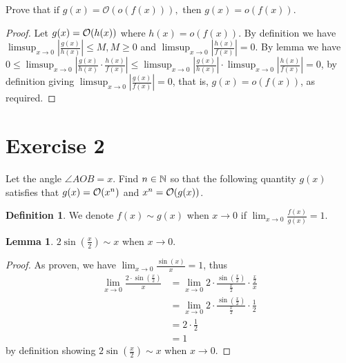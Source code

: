 \documentclass{homework}
\newcommand{\N}{\bb{N}} %
\newcommand{\ra}{\rightarrow}
\newcommand{\?}{\stackrel{?}{=}}
\theoremstyle{definition}
\newtheorem*{definition}{Definition}
\newtheorem*{lemma}{Lemma}
\begin{document}
\question[2] Prove that $\text{if~}g(x)=\mathcal{O}(o(f(x))),\text{~then~}g(x)=o(f(x))$.

\begin{proof}
    Let $g(x)=\cal{O}(h(x))$ where $h(x)=o(f(x))$. By definition we have $\limsup_{x\ra0}|\frac{g(x)}{h(x)}|\leq M, M\geq0$ and $\limsup_{x\ra0}|\frac{h(x)}{f(x)}|=0$. By lemma we have $0\leq\limsup_{x\ra0}|\frac{g(x)}{h(x)}\cdot\frac{h(x)}{f(x)}|\leq\limsup_{x\ra0}|\frac{g(x)}{h(x)}|\cdot\limsup_{x\ra0}|\frac{h(x)}{f(x)}|=0$, by definition giving $\limsup_{x\ra0}|\frac{g(x)}{f(x)}|=0$, that is, $g(x)=o(f(x))$, as required.
\end{proof}

\newpage
\section*{Exercise 2}
Let the angle $\angle AOB=x$. Find $n\in\N$ so that the following quantity $g(x)$ satisfies that $g(x)=\cal{O}(x^n)$ and $x^n=\cal{O}(g(x))$.


\begin{definition}
    We denote $f(x)\sim g(x)$ when $x\to0$ if $\lim_{x\to0}\frac{f(x)}{g(x)}=1$.
\end{definition}

\begin{lemma}
    $2\sin(\frac{x}2)\sim x$ when $x\to0$.

    \begin{proof}
        As proven, we have $\lim_{x\to0}\frac{\sin(x)}{x}=1$, thus \begin{align*}
            \lim_{x\to0}\frac{2\cdot\sin(\frac{x}2)}{x}&=\lim_{x\to0}2\cdot\frac{\sin(\frac{x}2)}{\frac{x}2}\cdot\frac{\frac{x}2}{x}\\
            &=\lim_{x\to0}2\cdot\frac{\sin(\frac{x}2)}{\frac{x}2}\cdot\frac12\\
            &=2\cdot\frac12\\
            &=1
        \end{align*}
        by definition showing $2\sin(\frac{x}2)\sim x$ when $x\to0$.
    \end{proof}
\end{lemma}
\end{document}
